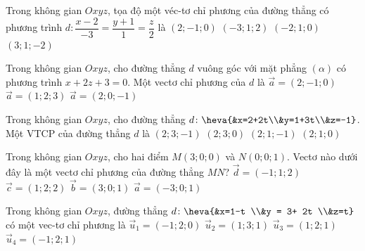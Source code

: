 \begin{ex}%
	Trong không gian $Oxyz$, tọa độ  một véc-tơ chỉ phương của đường thẳng có phương trình $d\colon\dfrac{x-2}{-3}=\dfrac{y+1}{1}=\dfrac{z}{2}$ là
	\choice 
		 {$(2;-1;0)$}
		{\True  $(-3;1;2)$}
		{$(-2;1;0)$} 
		{$(3;1;-2)$} 
\end{ex}

\begin{ex}%
	Trong  không gian $Oxyz$, cho đường thẳng $d$ vuông góc với mặt phẳng $(\alpha)$ có phương trình $x+2z+3=0$. Một vectơ chỉ phương của $d$ là
		{$\overrightarrow{a}=(2;-1;0)$} 
		{$\overrightarrow{a}=(1;2;3)$} 
		{$\overrightarrow{a}=(2;0;-1)$} 
\end{ex}

\begin{ex}%
	Trong  không gian $Oxyz$, cho đường thẳng $d\colon \heva{&x=2+2t\\&y=1+3t\\&z=-1}$. Một VTCP của đường thẳng $d$ là
	 \choice
		 {$(2;3;-1)$}
		{\True  $(2;3;0)$}
		 {$(2;1;-1)$}
		{$(2;1;  0)$}
\end{ex}

\begin{ex}%
	Trong không gian $Oxyz$, cho hai điểm  $M(3; 0; 0)$ và $N(0; 0; 1)$. Vectơ nào dưới đây là một vectơ chỉ phương của đường thẳng $MN$?
	 \choice
		 {$\overrightarrow{d}=(-1; 1; 2)$}
		{$\overrightarrow{c}=(1; 2;  2)$}
		 {$\overrightarrow{b}=(3; 0; 1)$}
		{\True  $\overrightarrow{a}=(-3; 0; 1)$}
\end{ex}

\begin{ex}%
	Trong không gian $Oxyz$, đường  thẳng $d \colon \heva{&x=1-t \\&y = 3+ 2t \\&z=t}$ có một vec-tơ chỉ phương là
	 \choice
		 {$\overrightarrow{u}_{1} =(-1;2;0)$}
		{$\overrightarrow{u}_{2} = (1;3;1)$} 
		{$\overrightarrow{u}_{3} =  (1;2;1)$}
		{\True  $\overrightarrow{u}_{4} =(-1;2;1)$}
\end{ex}

